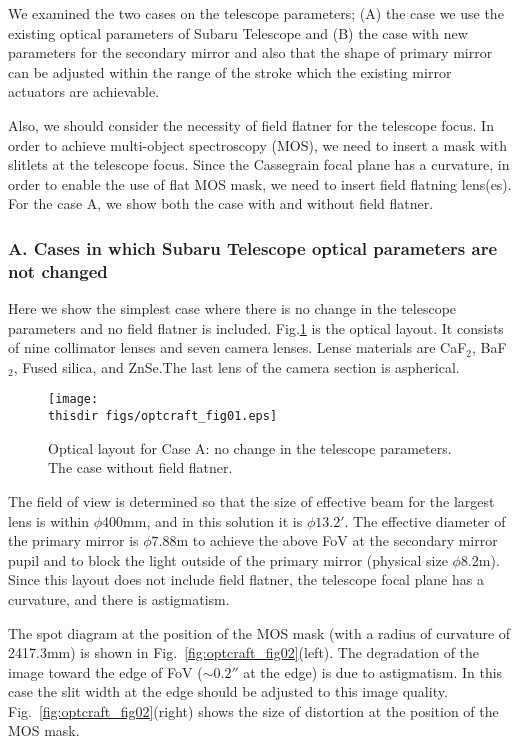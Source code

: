 We examined the two cases on the telescope parameters; (A) the case we
use the existing optical parameters of Subaru Telescope and (B) the case
with new parameters for the secondary mirror and also that the shape of 
primary mirror can be adjusted within the range of the stroke which the
existing mirror actuators are achievable.

Also, we should consider the necessity of field flatner for the
telescope focus. In order to achieve multi-object spectroscopy (MOS), we
need to insert a mask with slitlets at the telescope focus. Since the
Cassegrain focal plane has a curvature, in order to enable the use of
flat MOS mask, we need to insert field flatning lens(es). For the case
A, we show both the case with and without field flatner.

\subsubsection{A. Cases in which Subaru Telescope optical parameters are
   not changed}

Here we show the simplest case where there is no change in the telescope 
parameters and no field flatner is included.
Fig.\ref{fig:optcraft_fig01} is the optical layout. It consists of nine
collimator lenses and seven camera lenses. Lense materials are CaF$_2$, 
BaF$_2$, Fused silica, and ZnSe.The last lens of the camera section is
aspherical. 

\begin{figure}[!ht]
\centerline{
\texttt{[image: \\thisdir figs/optcraft\_fig01.eps]}
}
\caption{Optical layout for Case A: no change in the telescope
 parameters. The case without field flatner.
}
\label{fig:optcraft_fig01}
\end{figure}

The field of view is determined so that the size of effective beam for
the largest lens is within $\phi$400mm, and in this solution it is 
$\phi 13.2'$. The effective diameter of the primary mirror is 
$\phi 7.88$m to achieve the above FoV at the secondary mirror pupil and
to block the light outside of the primary mirror (physical size 
$\phi$8.2m). Since this layout does not include field flatner, the
telescope focal plane has a curvature, and there is astigmatism.

The spot diagram at the position of the MOS mask (with a radius of
curvature of 2417.3mm) is shown in
Fig.~\ref{fig:optcraft_fig02}(left). The degradation of the image toward
the edge of FoV ($\sim 0.2''$ at the edge) is due to astigmatism. 
In this case the slit width at the edge should be adjusted to this image
quality. 
Fig.~\ref{fig:optcraft_fig02}(right) shows the size of distortion at the
position of the MOS mask.

